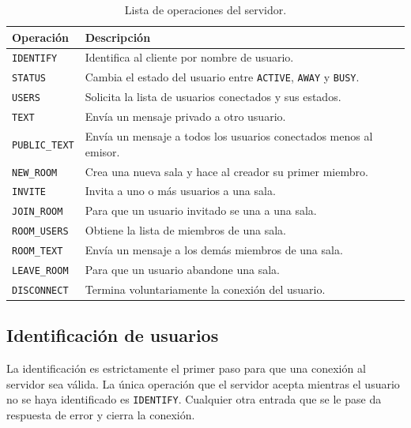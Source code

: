 \documentclass[12pt,letterpaper]{article}
\begin{document}
\begin{table}[H]
\centering
\small
\begin{tabular}{p{3.0cm}p{9.0cm}}
\toprule
\textbf{Operación} & \textbf{Descripción} \\
\midrule
\texttt{IDENTIFY} &
Identifica al cliente por nombre de usuario. \\

\texttt{STATUS} &
Cambia el estado del usuario entre \texttt{ACTIVE}, \texttt{AWAY} y
\texttt{BUSY}. \\

\texttt{USERS} &
Solicita la lista de usuarios conectados y sus estados. \\

\texttt{TEXT} &
Envía un mensaje privado a otro usuario. \\

\texttt{PUBLIC\_TEXT} &
Envía un mensaje a todos los usuarios conectados menos al emisor. \\

\texttt{NEW\_ROOM} &
Crea una nueva sala y hace al creador su primer miembro. \\

\texttt{INVITE} &
Invita a uno o más usuarios a una sala. \\

\texttt{JOIN\_ROOM} &
Para que un usuario invitado se una a una sala. \\

\texttt{ROOM\_USERS} &
Obtiene la lista de miembros de una sala. \\

\texttt{ROOM\_TEXT} &
Envía un mensaje a los demás miembros de una sala. \\

\texttt{LEAVE\_ROOM} &
Para que un usuario abandone una sala. \\

\texttt{DISCONNECT} &
Termina voluntariamente la conexión del usuario. \\
\bottomrule
\end{tabular}
\caption{Lista de operaciones del servidor.}
\label{tab:operaciones}
\end{table}

\subsection{Identificación de usuarios}

La identificación es estrictamente el primer paso para que una conexión al servidor sea válida. La única operación que el servidor acepta mientras el usuario no se haya identificado es 
\texttt{IDENTIFY}. Cualquier otra entrada que se le pase da respuesta de error
y cierra la conexión.
\end{document}
